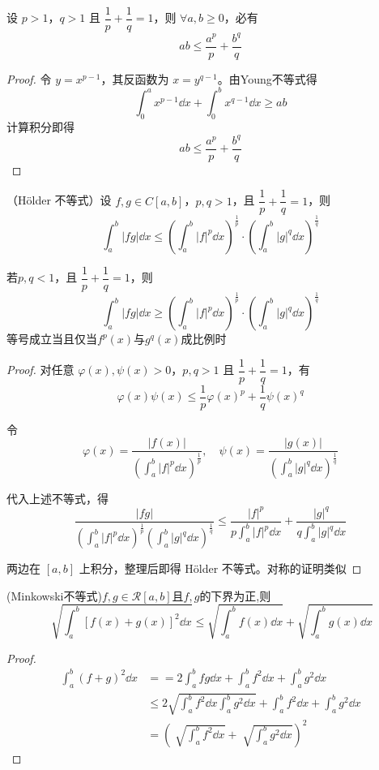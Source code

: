 \begin{corollary}
	设 $p>1$，$q>1$ 且 $\dfrac{1}{p} + \dfrac{1}{q} = 1$，则 $\forall a,b \geqslant 0$，必有
	\[
	ab \leqslant \frac{a^p}{p} + \frac{b^q}{q}
	\]
\end{corollary}
\begin{proof}
	令 $y = x^{p-1}$，其反函数为 $x = y^{q-1}$。由Young不等式得
	\[
	\int_{0}^{a} x^{p-1} \dd x + \int_{0}^{b} x^{q-1} \dd x \geqslant ab
	\]
	计算积分即得
	\[
	ab \leqslant \frac{a^p}{p} + \frac{b^q}{q}
	\]
\end{proof}
\begin{corollary}
	（Hölder 不等式）设 $f,g \in C[a,b]$，$p,q>1$，且 $\dfrac{1}{p} + \dfrac{1}{q} = 1$，则
	\[
	\int_{a}^{b} |fg| \dd x \leqslant \left( \int_{a}^{b} |f|^p \dd x \right)^{\frac{1}{p}} \cdot \left( \int_{a}^{b} |g|^q \dd x \right)^{\frac{1}{q}}
	\]
	
若$p,q<1$，且 $\dfrac{1}{p} + \dfrac{1}{q} = 1$，则
\[
\int_{a}^{b} |fg| \dd x \geqslant \left( \int_{a}^{b} |f|^p \dd x \right)^{\frac{1}{p}} \cdot \left( \int_{a}^{b} |g|^q \dd x \right)^{\frac{1}{q}}
\]
	等号成立当且仅当$f^p(x)$与$g^q(x)$成比例时
\end{corollary}
\begin{proof}
	对任意 $\varphi(x),\psi(x) > 0$，$p,q>1$ 且 $\dfrac{1}{p} + \dfrac{1}{q} = 1$，有
	\[
	\varphi(x)\psi(x) \leqslant \frac{1}{p} \varphi(x)^p + \frac{1}{q} \psi(x)^q
	\]
	
	令
	\[
	\varphi(x) = \frac{|f(x)|}{\left( \displaystyle\int_{a}^{b} |f|^p \dd x \right)^{\frac{1}{p}}}, \quad
	\psi(x) = \frac{|g(x)|}{\left( \displaystyle\int_{a}^{b} |g|^q \dd x \right)^{\frac{1}{q}}}
	\]
	
	代入上述不等式，得
	\[
	\frac{|fg|}{\left( \displaystyle\int_{a}^{b} |f|^p \dd x \right)^{\frac{1}{p}} \left( \displaystyle\int_{a}^{b} |g|^q \dd x \right)^{\frac{1}{q}}}
	\leqslant \frac{|f|^p}{p \displaystyle\int_{a}^{b} |f|^p \dd x} + \frac{|g|^q}{q \displaystyle\int_{a}^{b} |g|^q \dd x}
	\]
	
	两边在 $[a,b]$ 上积分，整理后即得 Hölder 不等式。对称的证明类似
\end{proof}
\begin{corollary}
	(Minkowski不等式)$f,g\in\mathcal{R}[a,b]$且$f,g$的下界为正,则\[\sqrt[]{\int_{a}^{b}[f(x)+g(x)]^2\dd x}\leqslant \sqrt{\int_{a}^{b}f(x)\dd x}+\sqrt{\int_{a}^{b}g(x)\dd x}\]
\end{corollary}
\begin{proof}

	\[\begin{aligned}
			\int_{a}^{b}(f+g)^2\dd x&==2\int_{a}^{b}fg\dd x+\int_{a}^{b}f^2\dd x+\int_{a}^{b}g^2\dd x\\
			&\leqslant 2\sqrt{\int_{a}^{b}f^2\dd x\int_{a}^{b}g^2\dd x}+\int_{a}^{b}f^2\dd x+\int_{a}^{b}g^2\dd x\\
			&=(\sqrt[]{\int_{a}^{b}f^2\dd x}+\sqrt[]{\int_{a}^{b}g^2\dd x})^2
	\end{aligned}\]
\end{proof}
